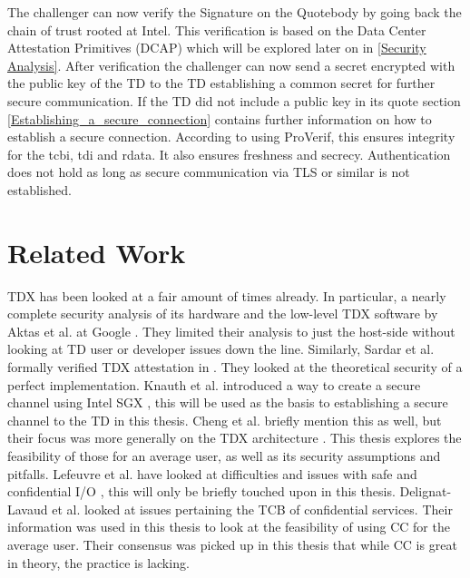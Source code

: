 The challenger can now verify the Signature on the Quotebody by going back the chain of trust rooted at Intel. This verification is based on the Data Center Attestation Primitives (DCAP) which will be explored later on in \ref{Security Analysis}. After verification the challenger can now send a secret encrypted with the public key of the TD to the TD establishing a common secret for further secure communication. If the TD did not include a public key in its quote section \cref{Establishing_a_secure_connection} contains further information on how to establish a secure connection. According to \cite{sardar_formal_2023} using ProVerif, this ensures integrity for the tcbi, tdi and rdata. It also ensures freshness and secrecy. Authentication does not hold as long as secure communication via TLS or similar is not established.

\section{Related Work}
TDX has been looked at a fair amount of times already. In particular, a nearly complete security analysis of its hardware and the low-level TDX software by Aktas et al. at Google \cite{aktas_intel_nodate}. They limited their analysis to just the host-side without looking at TD user or developer issues down the line. Similarly, Sardar et al. formally verified TDX attestation in \cite{sardar_demystifying_2021}. They looked at the theoretical security of a perfect implementation. Knauth et al. introduced a way to create a secure channel using Intel SGX \cite{knauth_integrating_2019}, this will be used as the basis to establishing a secure channel to the TD in this thesis. Cheng et al. briefly mention this as well, but their focus was more generally on the TDX architecture \cite{cheng_intel_2023}. This thesis explores the feasibility of those for an average user, as well as its security assumptions and pitfalls. Lefeuvre et al. have looked at difficulties and issues with safe and confidential I/O \cite{lefeuvre_towards_2023}, this will only be briefly touched upon in this thesis. Delignat-Lavaud et al. looked at issues pertaining the TCB of confidential services. Their information was used in this thesis to look at the feasibility of using CC for the average user. Their consensus was picked up in this thesis that while CC is great in theory, the practice is lacking.

